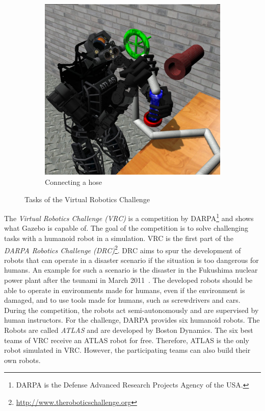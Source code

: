 \begin{figure}
\begin{subfigure}[b]{0.3\textwidth}
    \label{fig:vrc_walking}
  \end{subfigure}
  \begin{subfigure}[b]{0.3\textwidth}
    \includegraphics[width=\textwidth]{pics/darpa_hose}
    \caption{Connecting a hose}
    \label{fig:vrc_hose}
  \end{subfigure}
  \caption[Tasks of the Virtual Robotics Challenge]{Tasks of the Virtual Robotics Challenge~\cite{vrc_pics}}
  \label{fig:vrc}
\end{figure}
The \textit{Virtual Robotics Challenge (VRC)} is a competition by DARPA\footnote{DARPA is the Defense Advanced Research Projects Agency of the USA.} and shows what Gazebo is capable of. The goal of the competition is to solve challenging tasks with a humanoid robot in a simulation. VRC is the first part of the \textit{DARPA Robotics Challenge (DRC)}\footnote{\url{http://www.theroboticschallenge.org}}. DRC aims to spur the development of robots that can operate in a disaster scenario if the situation is too dangerous for humans. An example for such a scenario is the disaster in the Fukushima nuclear power plant after the tsunami in March 2011~\cite{fukushima}. The developed robots should be able to operate in environments made for humans, even if the environment is damaged, and to use tools made for humans, such as screwdrivers and cars. During the competition, the robots act semi-autonomously and are supervised by human instructors. For the challenge, DARPA provides six humanoid robots. The Robots are called \textit{ATLAS} and are developed by Boston Dynamics. The six best teams of VRC receive an ATLAS robot for free. Therefore, ATLAS is the only robot simulated in VRC. However, the participating teams can also build their own robots.
